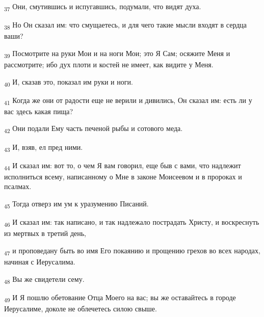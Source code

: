 \begin{tcolorbox}
\textsubscript{37} Они, смутившись и испугавшись, подумали, что видят духа.
\end{tcolorbox}
\begin{tcolorbox}
\textsubscript{38} Но Он сказал им: что смущаетесь, и для чего такие мысли входят в сердца ваши?
\end{tcolorbox}
\begin{tcolorbox}
\textsubscript{39} Посмотрите на руки Мои и на ноги Мои; это Я Сам; осяжите Меня и рассмотрите; ибо дух плоти и костей не имеет, как видите у Меня.
\end{tcolorbox}
\begin{tcolorbox}
\textsubscript{40} И, сказав это, показал им руки и ноги.
\end{tcolorbox}
\begin{tcolorbox}
\textsubscript{41} Когда же они от радости еще не верили и дивились, Он сказал им: есть ли у вас здесь какая пища?
\end{tcolorbox}
\begin{tcolorbox}
\textsubscript{42} Они подали Ему часть печеной рыбы и сотового меда.
\end{tcolorbox}
\begin{tcolorbox}
\textsubscript{43} И, взяв, ел пред ними.
\end{tcolorbox}
\begin{tcolorbox}
\textsubscript{44} И сказал им: вот то, о чем Я вам говорил, еще быв с вами, что надлежит исполниться всему, написанному о Мне в законе Моисеевом и в пророках и псалмах.
\end{tcolorbox}
\begin{tcolorbox}
\textsubscript{45} Тогда отверз им ум к уразумению Писаний.
\end{tcolorbox}
\begin{tcolorbox}
\textsubscript{46} И сказал им: так написано, и так надлежало пострадать Христу, и воскреснуть из мертвых в третий день,
\end{tcolorbox}
\begin{tcolorbox}
\textsubscript{47} и проповедану быть во имя Его покаянию и прощению грехов во всех народах, начиная с Иерусалима.
\end{tcolorbox}
\begin{tcolorbox}
\textsubscript{48} Вы же свидетели сему.
\end{tcolorbox}
\begin{tcolorbox}
\textsubscript{49} И Я пошлю обетование Отца Моего на вас; вы же оставайтесь в городе Иерусалиме, доколе не облечетесь силою свыше.
\end{tcolorbox}
